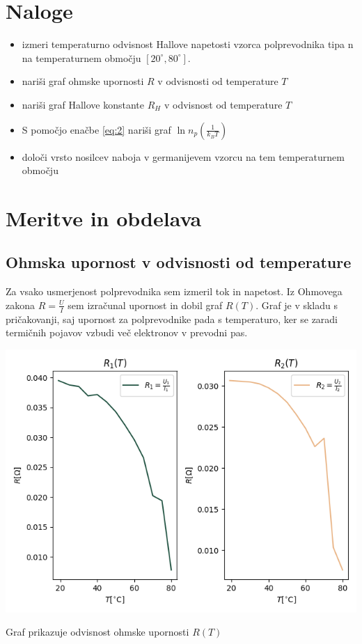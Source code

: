 \documentclass[11pt]{article}
\begin{document}
\section{Naloge}\label{sec:org46b2437}
\begin{itemize}
\item izmeri temperaturno odvisnost Hallove napetosti vzorca polprevodnika tipa n na temperaturnem območju \([20^{\circ}, 80^{\circ}]\).
\item nariši graf ohmske upornosti \(R\) v odvisnosti od temperature \(T\)
\item nariši graf Hallove konstante \(R_H\) v odvisnost od temperature \(T\)
\item S pomočjo enačbe \ref{eq:2} nariši graf \(\ln n_p\left(\frac{1}{k_B T}\right)\)
\item določi vrsto nosilcev naboja v germanijevem vzorcu na tem temperaturnem območju
\end{itemize}

\section{Meritve in obdelava}\label{sec:org6fdafc2}
\subsection{Ohmska upornost v odvisnosti od temperature}\label{sec:orgb67dd5c}
Za vsako usmerjenost polprevodnika sem izmeril tok in napetost. Iz Ohmovega zakona \(R = \frac{U}{I}\) sem izračunal upornost in dobil graf \(R(T)\). Graf je v skladu s pričakovanji, saj upornost za polprevodnike pada s temperaturo, ker se zaradi termičnih pojavov vzbudi več elektronov v prevodni pas.

\begin{slika}[H]
\begin{center}
\includegraphics[width=.9\linewidth]{figures/r_od_T.png}
\end{center}
\caption{\small Graf prikazuje odvisnost ohmske upornosti $R(T)$}
\end{slika}
\end{document}
